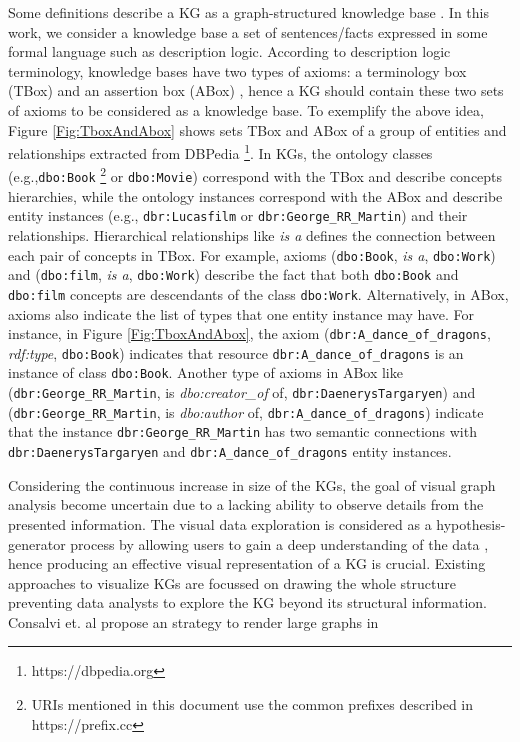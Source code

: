 \documentclass{ieeeaccess}
\begin{document}
Some definitions describe a KG as a graph-structured knowledge
base \cite{nickel2015review, seufert2016instant}. In this work, we 
consider a knowledge base a set of sentences/facts expressed in some 
formal language such as description logic. According to description 
logic terminology, knowledge bases have two types of axioms: a terminology
box (TBox) and an assertion box (ABox) \cite{horrocks2008ontologies}, hence a 
KG should contain these two sets of axioms to be considered as a knowledge 
base. To exemplify the above idea, Figure \ref{Fig:TboxAndAbox} shows sets 
TBox and ABox of a group of entities and relationships extracted from DBPedia
\cite{auer2007dbpedia} \footnote{https://dbpedia.org}. In KGs, the ontology 
classes (e.g.,\texttt{dbo:Book} \footnote{URIs mentioned in this document use
the common prefixes described in https://prefix.cc} or \texttt{dbo:Movie})
correspond with the TBox and describe concepts hierarchies, while the ontology 
instances correspond with the ABox and describe entity instances (e.g., 
\texttt{dbr:Lucasfilm} or \texttt{dbr:George\_RR\_Martin}) and their
relationships.  Hierarchical relationships like \textit{is a} defines the 
connection between each pair of concepts in TBox. For example, axioms 
(\texttt{dbo:Book}, \textit{is a}, \texttt{dbo:Work})
and (\texttt{dbo:film}, \textit{is a}, \texttt{dbo:Work}) describe
the fact that both \texttt{dbo:Book} and \texttt{dbo:film} concepts
are descendants of the class \texttt{dbo:Work}. Alternatively, in
ABox, axioms also indicate the list of types that one entity
instance may have. For instance, in Figure \ref{Fig:TboxAndAbox},
the axiom (\texttt{dbr:A\_dance\_of\_dragons}, \textit{rdf:type},
\texttt{dbo:Book}) indicates that resource
\texttt{dbr:A\_dance\_of\_dragons} is an instance of class
\texttt{dbo:Book}. Another type of axioms in ABox like
(\texttt{dbr:George\_RR\_Martin}, is \textit{dbo:creator\_of}
of, \texttt{dbr:DaenerysTargaryen}) and 
(\texttt{dbr:George\_RR\_Martin}, is \textit{dbo:author} of,
\texttt{dbr:A\_dance\_of\_dragons}) indicate
that the instance \texttt{dbr:George\_RR\_Martin} has two semantic
connections with \texttt{dbr:DaenerysTargaryen} and 
\texttt{dbr:A\_dance\_of\_dragons} entity instances.

Considering the continuous increase in size of the KGs, the goal of 
visual graph analysis become uncertain due to a lacking ability to observe 
details from the presented information. The visual data exploration is considered as a
hypothesis-generator process by allowing users to gain a deep understanding 
of the data \cite{keim2001visual}, hence producing an effective visual
representation of a KG is crucial. Existing approaches to visualize KGs
are focussed on drawing the whole structure
\cite{gomez2018visualizing} preventing data analysts to explore the KG
beyond its structural information. Consalvi et. al \cite{Consalvi2022} 
propose an strategy to render large graphs in 
\end{document}
